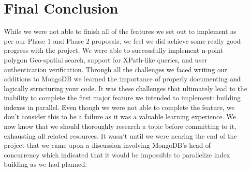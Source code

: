 \documentclass{../dependencies/acm_proc_article-sp}
\begin{document}
\section{Final Conclusion}
While we were not able to finish all of the features we set out to implement as
per our Phase 1 and Phase 2 proposals, we feel we did achieve some really good
progress with the project. We were able to successfully implement n-point
polygon Geo-spatial search, support for XPath-like queries, and user
authentication verification. Through all the challenges we faced writing our
additions to MongoDB we learned the importance of properly documenting and
logically structuring your code. It was these challenges that ultimately lead
to the inability to complete the first major feature we intended to implement:
building indexes in parallel. Even though we were not able to complete the
feature, we don't consider this to be a failure as it was a valuable learning
experience. We now know that we should thoroughly research a topic before
committing to it, exhausting all related resources. It wasn't until we were
nearing the end of the project that we came upon a discussion involving
MongoDB's head of concurrency which indicated that it would be impossible to parallelize index building as we had planned\cite{2}.
\newpage
%

%
%
\balancecolumns
\end{document}
